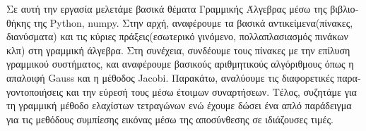\thispagestyle{plain}
\newpage
\vspace*{\fill}
\begin{center}
    \vspace{0.9cm}
    \textbf{}
\end{center}
\begin{otherlanguage}{greek}
Σε αυτή την εργασία μελετάμε βασικά θέματα Γραμμικής Άλγεβρας μέσω της βιβλιοθήκης της {\en Python}, {\en numpy}. Στην αρχή, αναφέρουμε τα βασικά αντικείμενα(πίνακες, διανύσματα) και τις κύριες πράξεις(εσωτερικό γινόμενο, πολλαπλασιασμός πινάκων κλπ) στη γραμμική άλγεβρα. Στη συνέχεια, συνδέουμε τους πίνακες με την επίλυση γραμμικού συστήματος, και αναφέρουμε βασικούς αριθμητικούς αλγόριθμους όπως η απαλοιφή {\en Gauss} και η μέθοδος {\en Jacobi}. Παρακάτω, αναλύουμε τις διαφορετικές παραγοντοποιήσεις και την εύρεσή τους μέσω έτοιμων συναρτήσεων. Τέλος, συζητάμε για τη γραμμική μέθοδο ελαχίστων τετραγώνων ενώ έχουμε δώσει ένα απλό παράδειγμα για τις μεθόδους συμπίεσης εικόνας μέσω της αποσύνθεσης σε ιδιάζουσες τιμές.
\end{otherlanguage}
\vspace*{\fill}